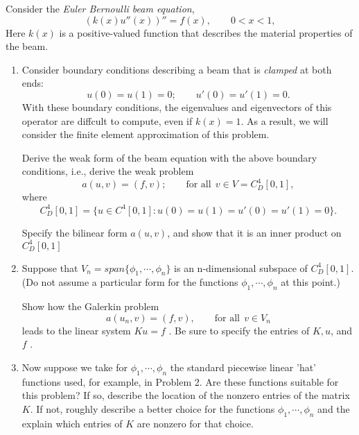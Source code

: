 Consider the \textit{Euler Bernoulli beam equation},
\[
(k(x)u''(x))'' = f(x), \qquad 0 < x < 1,
\]
Here $k(x)$ is a positive-valued function that describes the material properties of the beam.  

\begin{enumerate}

\item Consider boundary conditions describing a beam that is \textit{clamped} at both ends:
\[
u(0) = u(1) = 0; \qquad  u'(0) = u'(1) = 0.
\]
With these boundary conditions, the eigenvalues and eigenvectors of this operator are diffcult to compute, even if $k(x)=1$.  As a result, we will consider the finite element approximation of this problem.  

Derive the weak form of the beam equation with the above boundary conditions, i.e., derive the weak problem
\[
a(u,v) = (f, v); \qquad \mbox{for all} \:\:v \in V = C_D^4[0, 1],
\]
where
\[
C_D^4[0, 1] = \{u \in C^4[0, 1] : u(0) = u(1) = u'(0) = u'(1) = 0\}.
\]

Specify the bilinear form $a(u, v)$, and show that it is an inner product on $C_D^4[0, 1]$

\item Suppose that $V_n = span\{\phi_1, \cdots, \phi_n\}$ is an n-dimensional subspace of $C_D^4[0, 1].$
(Do not assume a particular form for the functions $\phi_1, \cdots, \phi_n$ at this point.)

Show how the Galerkin problem
\[
a(u_n, v) = (f, v), \qquad \mbox{for all}\:\: v \in V_n
\]
leads to the linear system $Ku = f$ . Be sure to specify the entries of $K, u$, and $f$ .

\item Now suppose we take for $\phi_1, \cdots, \phi_n$  the standard piecewise linear 'hat' functions used, for example, in Problem 2. Are these functions suitable for this problem? If so, describe the location of the
nonzero entries of the matrix $K$. If not, roughly describe a better choice for the functions $\phi_1, \cdots, \phi_n$ 
and the explain which entries of $K$ are nonzero for that choice.
\end{enumerate}

